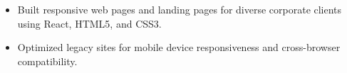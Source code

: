 \vspace{6pt}

\begin{itemize}[leftmargin=*, noitemsep]
    \item Built responsive web pages and landing pages for diverse corporate clients using React, HTML5, and CSS3.
    \item Optimized legacy sites for mobile device responsiveness and cross-browser compatibility.
\end{itemize}
